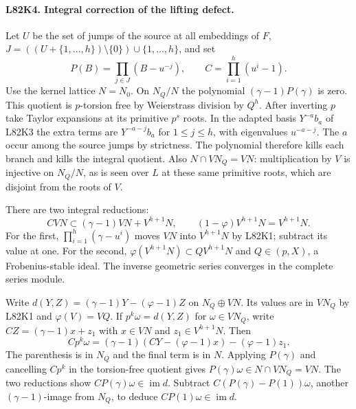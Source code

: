 \paragraph{L82K4. Integral correction of the lifting defect.}
Let $U$ be the set of jumps of the source at all embeddings
of $F$, $J=((U+\{1,\ldots,h\})\setminus\{0\})\cup
\{1,\ldots,h\}$, and set
\[
      P(B)=\prod_{j\in J}(B-u^{-j}),\qquad
      C=\prod_{i=1}^h(u^i-1).
\]
Use the kernel lattice $N=N_0$. On $N_Q/N$ the polynomial
$(\gamma-1)P(\gamma)$ is zero. This quotient is $p$-torsion
free by Weierstrass division by $Q^h$. After inverting $p$ take
Taylor expansions at its primitive $p^s$ roots. In the adapted
basis $Y^{-a}b_a$ of L82K3 the extra terms are
$Y^{-a-j}b_a$ for $1\le j\le h$, with eigenvalues $u^{-a-j}$.
The $a$ occur among the source jumps by strictness. The polynomial
therefore kills each branch and kills the integral quotient.
Also $N\cap VN_Q=VN$: multiplication by $V$ is injective on
$N_Q/N$, as is seen over $L$ at these same primitive roots,
which are disjoint from the roots of $V$.

There are two integral reductions:
\[
 CVN\subset(\gamma-1)VN+V^{h+1}N,\qquad
 (1-\varphi)V^{h+1}N=V^{h+1}N .
\]
For the first, $\prod_{i=1}^h(\gamma-u^i)$ moves $VN$ into
$V^{h+1}N$ by L82K1; subtract its value at one. For the second,
$\varphi(V^{h+1}N)\subset QV^{h+1}N$ and $Q\in(p,X)$,
a Frobenius-stable ideal. The inverse geometric series converges
in the complete series module.

Write $d(Y,Z)=(\gamma-1)Y-(\varphi-1)Z$ on
$N_Q\oplus VN$. Its values are in $VN_Q$ by L82K1 and
$\varphi(V)=VQ$. If $p^k\omega=d(Y,Z)$ for
$\omega\in VN_Q$, write $CZ=(\gamma-1)x+z_1$ with $x\in VN$
and $z_1\in V^{h+1}N$. Then
\[
 Cp^k\omega=(\gamma-1)(CY-(\varphi-1)x)-(\varphi-1)z_1 .
\]
The parenthesis is in $N_Q$ and the final term is in $N$.
Applying $P(\gamma)$ and cancelling $Cp^k$ in the torsion-free
quotient gives $P(\gamma)\omega\in N\cap VN_Q=VN$. The two
reductions show $CP(\gamma)\omega\in\operatorname{im}d$.
Subtract $C(P(\gamma)-P(1))\omega$, another $(\gamma-1)$-image
from $N_Q$, to deduce $CP(1)\omega\in\operatorname{im}d$.

